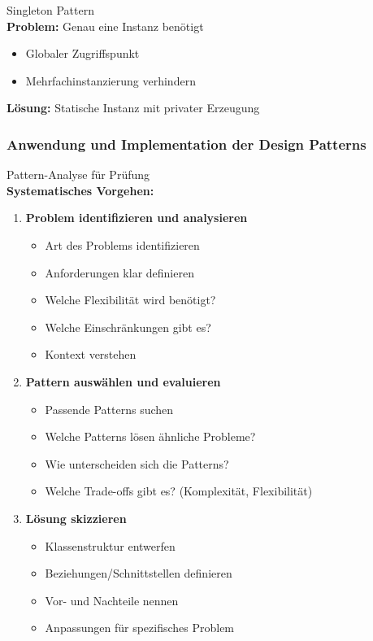 \begin{definition}{Singleton Pattern}\\
\textbf{Problem:} Genau eine Instanz benötigt
\begin{itemize}
    \item Globaler Zugriffspunkt
    \item Mehrfachinstanzierung verhindern
\end{itemize}
\textbf{Lösung:} Statische Instanz mit privater Erzeugung
\end{definition}

\subsubsection{Anwendung und Implementation der Design Patterns}

\begin{KR}{Pattern-Analyse für Prüfung}\\
\textbf{Systematisches Vorgehen:}
\begin{enumerate}
    \item \textbf{Problem identifizieren und analysieren}
    \begin{itemize}
        \item Art des Problems identifizieren
        \item Anforderungen klar definieren
        \item Welche Flexibilität wird benötigt?
        \item Welche Einschränkungen gibt es?
        \item Kontext verstehen
    \end{itemize}
    
    \item \textbf{Pattern auswählen und evaluieren}
    \begin{itemize}
        \item Passende Patterns suchen
        \item Welche Patterns lösen ähnliche Probleme?
        \item Wie unterscheiden sich die Patterns?
        \item Welche Trade-offs gibt es? (Komplexität, Flexibilität)
    \end{itemize}
    
    \item \textbf{Lösung skizzieren}
    \begin{itemize}
        \item Klassenstruktur entwerfen
        \item Beziehungen/Schnittstellen definieren
        \item Vor- und Nachteile nennen
        \item Anpassungen für spezifisches Problem
    \end{itemize}
\end{enumerate}
\end{KR}

